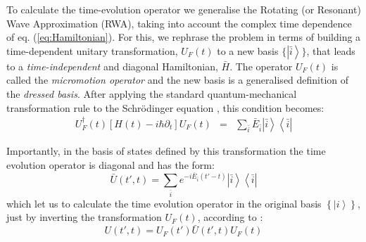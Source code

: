 \documentclass[10pt,a4paper]{article}
\begin{document}
To calculate the time-evolution operator we generalise the Rotating (or Resonant) Wave Approximation (RWA), taking into account the complex time dependence of eq. (\ref{eq:Hamiltonian}). For this, we rephrase the problem in terms of building a time-dependent unitary transformation, $U_F(t)$ to a new basis $\{\left| \bar{i} \right\rangle\}$, that leads to a \textit{time-independent} and diagonal Hamiltonian, $\bar{H}$. The operator $U_F(t)$ is called the \textit{micromotion operator} and the new basis is a generalised definition of the \textit{dressed basis}. After applying the standard quantum-mechanical transformation rule to the Schr\"odinger equation \cite{chu1985recent,PhysRevA.81.063626}, this condition becomes:
\begin{eqnarray}
 U_F^\dagger(t) \left[ H(t) - i \hbar \partial_t \right] U_F(t)  &=& \sum_{\bar{i}} \bar{E}_{\bar{i}} \left| \bar{i} \right\rangle \left\langle \bar{i} \right|
\label{eq:Hdressed}
\end{eqnarray}

Importantly, in the basis of states defined by this transformation the time evolution operator is diagonal and has the form:
\begin{equation}
\bar{U}(t',t) = \sum_{\bar{i}} e^{-i \bar{E}_{\bar{i}} (t'-t)} \left| \bar{i} \right\rangle \left\langle \bar{i} \right|
\label{eq:dressedtimeevolution}
\end{equation}
which let us to calculate the time evolution operator in the original basis $\left\{ \left| i\right\rangle\right\}$, just by inverting the transformation $U_F(t)$, according to \cite{PhysRevA.81.063626}:
\begin{equation}
U(t',t) = U_F(t') \bar{U}(t',t) U_F(t)
\label{eq:baretimeevolution}
\end{equation}
\end{document}
